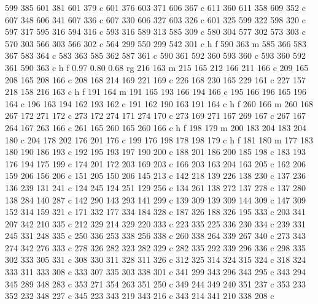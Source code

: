 {{        599 385 601 381 601 379 c
        601 376 603 371 606 367 c
        611 360 611 358 609 352 c
        607 348 606 341 607 336 c
        607 330 606 327 603 326 c
        601 325 599 322 598 320 c
        597 317 595 316 594 316 c
        593 316 589 313 585 309 c
        580 304 577 302 573 303 c
        570 303 566 303 566 302 c
        564 299 550 299 542 301 c
        h f
        590 363 m
        585 366 583 367 583 364 c
        583 363 585 362 587 361 c
        590 361 592 360 593 360 c
        593 360 592 361 590 363 c
        h f
        0.97 0.80 0.68 rg
        216 163 m
        215 165 212 166 211 166 c
        209 165 208 165 208 166 c
        208 168 214 169 221 169 c
        226 168 230 165 229 161 c
        227 157 218 158 216 163 c
        h f
        191 164 m
        191 165 193 166 194 166 c
        195 166 196 165 196 164 c
        196 163 194 162 193 162 c
        191 162 190 163 191 164 c
        h f
        260 166 m
        260 168 267 172 271 172 c
        273 172 274 171 274 170 c
        273 169 271 167 269 167 c
        267 167 264 167 263 166 c
        261 165 260 165 260 166 c
        h f
        198 179 m
        200 183 204 183 204 180 c
        204 178 202 176 201 176 c
        199 176 198 178 198 179 c
        h f
        181 180 m
        177 183 180 190 186 193 c
        192 195 193 197 190 200 c
        188 201 186 200 185 198 c
        183 193 176 194 175 199 c
        174 201 172 203 169 203 c
        166 203 163 204 163 205 c
        162 206 159 206 156 206 c
        151 205 150 206 145 213 c
        142 218 139 226 138 230 c
        137 236 136 239 131 241 c
        124 245 124 251 129 256 c
        134 261 138 272 137 278 c
        137 280 138 284 140 287 c
        142 290 143 293 141 299 c
        139 309 139 309 144 309 c
        147 309 152 314 159 321 c
        171 332 177 334 184 328 c
        187 326 188 326 195 333 c
        203 341 207 342 210 335 c
        212 329 214 329 220 333 c
        223 335 225 336 230 334 c
        239 331 245 331 248 335 c
        250 336 253 338 256 338 c
        260 338 264 339 267 340 c
        273 343 274 342 276 333 c
        278 326 282 323 282 329 c
        282 335 292 339 296 336 c
        298 335 302 333 305 331 c
        308 330 311 328 311 326 c
        312 325 314 324 315 324 c
        318 324 333 311 333 308 c
        333 307 335 303 338 301 c
        341 299 343 296 343 295 c
        343 294 345 289 348 283 c
        353 271 354 263 351 250 c
        349 244 349 240 351 237 c
        353 233 352 232 348 227 c
        345 223 343 219 343 216 c
        343 214 341 210 338 208 c
}}
